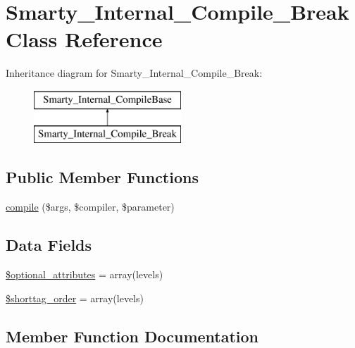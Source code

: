 \hypertarget{class_smarty___internal___compile___break}{}\section{Smarty\+\_\+\+Internal\+\_\+\+Compile\+\_\+\+Break Class Reference}
\label{class_smarty___internal___compile___break}
Inheritance diagram for Smarty\+\_\+\+Internal\+\_\+\+Compile\+\_\+\+Break\+:\begin{figure}[H]
\begin{center}
\leavevmode
\includegraphics[height=2.000000cm]{class_smarty___internal___compile___break}
\end{center}
\end{figure}
\subsection*{Public Member Functions}
\begin{DoxyCompactItemize}
\item 
\hyperlink{class_smarty___internal___compile___break_a84998958b9fc8c11c2ebe9620a49b853}{compile} (\$args, \$compiler, \$parameter)
\end{DoxyCompactItemize}
\subsection*{Data Fields}
\begin{DoxyCompactItemize}
\item 
\hyperlink{class_smarty___internal___compile___break_a899d1eb4a6fecbd6ce696adb171c80a4}{\$optional\+\_\+attributes} = array(\textquotesingle{}levels\textquotesingle{})
\item 
\hyperlink{class_smarty___internal___compile___break_a2ccb25269c3a92e8c4796c7ef23725e6}{\$shorttag\+\_\+order} = array(\textquotesingle{}levels\textquotesingle{})
\end{DoxyCompactItemize}


\subsection{Member Function Documentation}
\hypertarget{class_smarty___internal___compile___break_a84998958b9fc8c11c2ebe9620a49b853}{}
